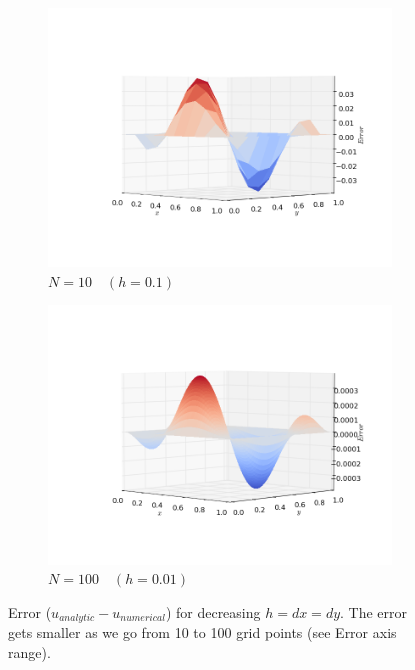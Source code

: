 \documentclass[11pt]{report}
\begin{document}
\begin{figure}[h!]
\centering
\begin{subfigure}{0.5\textwidth}
  \centering
  \includegraphics[width=1.0\linewidth]{images/example4_10}
  \caption{$N = 10 \quad (h = 0.1)$}
\end{subfigure}
\begin{subfigure}{0.5\textwidth}
  \centering
  \includegraphics[width=1.0\linewidth]{images/example4_100}
  \caption{$N = 100  \quad (h = 0.01)$}
\end{subfigure}
\caption{Error ($u_{analytic} - u_{numerical}$) for decreasing $h = dx = dy$. The error gets smaller as we go from 10 to 100 grid points (see Error axis range).}
\label{fig:example4.1}
\end{figure}
\end{document}
